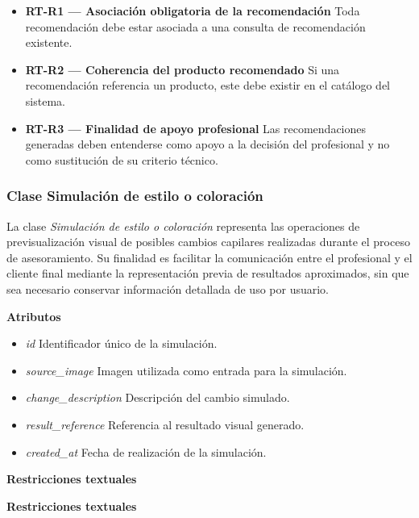 \begin{itemize}

      \item \textbf{RT-R1 — Asociación obligatoria de la recomendación}
            Toda recomendación debe estar asociada a una consulta de recomendación existente.
      \item \textbf{RT-R2 — Coherencia del producto recomendado}
            Si una recomendación referencia un producto, este debe existir en el catálogo del sistema.
      \item \textbf{RT-R3 — Finalidad de apoyo profesional}
            Las recomendaciones generadas deben entenderse como apoyo a la decisión del profesional y no como sustitución de su criterio técnico.

\end{itemize}

\subsubsection{Clase Simulación de estilo o coloración}

La clase \textit{Simulación de estilo o coloración} representa las operaciones de previsualización visual de posibles cambios capilares realizadas durante el proceso de asesoramiento. Su finalidad es facilitar la comunicación entre el profesional y el cliente final mediante la representación previa de resultados aproximados, sin que sea necesario conservar información detallada de uso por usuario.

\textbf{Atributos}

\begin{itemize}

      \item \textit{id}
            Identificador único de la simulación.
      \item \textit{source\_image}
            Imagen utilizada como entrada para la simulación.
      \item \textit{change\_description}
            Descripción del cambio simulado.
      \item \textit{result\_reference}
            Referencia al resultado visual generado.
      \item \textit{created\_at}
            Fecha de realización de la simulación.

\end{itemize}

\textbf{Restricciones textuales}

\textbf{Restricciones textuales}


